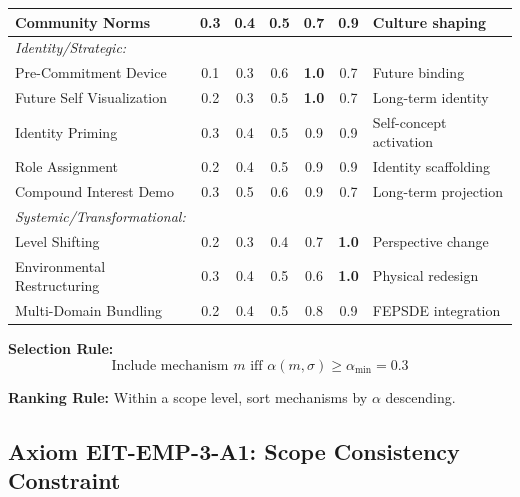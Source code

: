 \begin{tcolorbox}[colback=green!5!white, colframe=green!75!black,
    title=\textbf{EIT-EMP-3-D2-EXT: Full Scope-Mechanism Affinity Matrix}]
\begin{center}
\begin{tabular}{l|ccccc|l}
Community Norms & 0.3 & 0.4 & 0.5 & 0.7 & \textbf{0.9} & Culture shaping \\
\midrule
\multicolumn{7}{l}{\textit{Identity/Strategic:}} \\
Pre-Commitment Device & 0.1 & 0.3 & 0.6 & \textbf{1.0} & 0.7 & Future binding \\
Future Self Visualization & 0.2 & 0.3 & 0.5 & \textbf{1.0} & 0.7 & Long-term identity \\
Identity Priming & 0.3 & 0.4 & 0.5 & 0.9 & 0.9 & Self-concept activation \\
Role Assignment & 0.2 & 0.4 & 0.5 & 0.9 & 0.9 & Identity scaffolding \\
Compound Interest Demo & 0.3 & 0.5 & 0.6 & 0.9 & 0.7 & Long-term projection \\
\midrule
\multicolumn{7}{l}{\textit{Systemic/Transformational:}} \\
Level Shifting & 0.2 & 0.3 & 0.4 & 0.7 & \textbf{1.0} & Perspective change \\
Environmental Restructuring & 0.3 & 0.4 & 0.5 & 0.6 & \textbf{1.0} & Physical redesign \\
Multi-Domain Bundling & 0.2 & 0.4 & 0.5 & 0.8 & 0.9 & FEPSDE integration \\
\bottomrule
\end{tabular}
\end{center}

\textbf{Selection Rule:}
\begin{equation}
\text{Include mechanism } m \text{ iff } \alpha(m, \sigma) \geq \alpha_{\min} = 0.3
\end{equation}

\textbf{Ranking Rule:} Within a scope level, sort mechanisms by $\alpha$ descending.

\end{tcolorbox}

\subsection{Axiom EIT-EMP-3-A1: Scope Consistency Constraint}
\label{subsec:scope-consistency}

